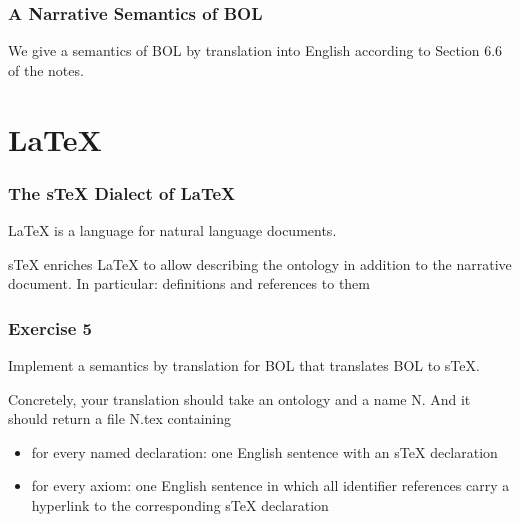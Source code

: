 \begin{frame}\frametitle{A Narrative Semantics of BOL}
We give a semantics of BOL by translation into English according to Section 6.6 of the notes.
\end{frame}

\section{LaTeX}

\begin{frame}\frametitle{The sTeX Dialect of LaTeX}
LaTeX is a language for natural language documents.

sTeX enriches LaTeX to allow describing the ontology in addition to the narrative document.
In particular: definitions and references to them
\end{frame}

\begin{frame}\frametitle{Exercise 5}
Implement a semantics by translation for BOL that translates BOL to sTeX.

Concretely, your translation should take an ontology and a name N.
And it should return a file N.tex containing
\begin{itemize}
 \item for every named declaration: one English sentence with an sTeX declaration
 \item for every axiom: one English sentence in which all identifier references carry a hyperlink to the corresponding sTeX declaration
\end{itemize}
\end{frame}
